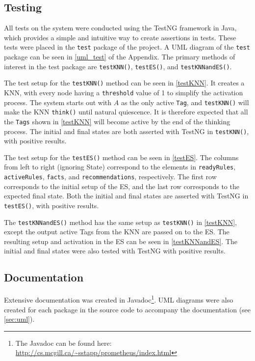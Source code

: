 \documentclass[titlepage,11pt]{article}
\newcommand{\code}[1]{\texttt{#1}}
\begin{document}
\subsection{Testing}

All tests on the system were conducted using the TestNG framework in Java, which provides a simple and intuitive way to create assertions in tests. These tests were placed in the \code{test} package of the project. A UML diagram of the \code{test} package can be seen in \autoref{uml_test} of the Appendix. The primary methods of interest in the test package are \code{testKNN()}, \code{testES()}, and \code{testKNNandES()}.

The test setup for the \code{testKNN()} method can be seen in \autoref{testKNN}. It creates a KNN, with every node having a \code{threshold} value of 1 to simplify the activation process. The system starts out with $A$ as the only active \code{Tag}, and \code{testKNN()} will make the KNN \code{think()} until natural quiescence. It is therefore expected that all the \code{Tags} shown in \autoref{testKNN} will become active by the end of the thinking process. The initial and final states are both asserted with TestNG in \code{testKNN()}, with positive results.

The test setup for the \code{testES()} method can be seen in \autoref{testES}. The columns from left to right (ignoring State) correspond to the elements in \code{readyRules}, \code{activeRules}, \code{facts}, and \code{recommendations}, respectively. The first row corresponds to the initial setup of the ES, and the last row corresponds to the expected final state. Both the initial and final states are asserted with TestNG in \code{testES()}, with positive results.

The \code{testKNNandES()} method has the same setup as \code{testKNN()} in \autoref{testKNN}, except the output active Tags from the KNN are passed on to the ES. The resulting setup and activation in the ES can be seen in \autoref{testKNNandES}. The initial and final states were also tested with TestNG with positive results.

\subsection{Documentation}

 Extensive documentation was created in Javadoc\footnote{The Javadoc can be found here: \url{http://cs.mcgill.ca/~sstapp/prometheus/index.html}}. UML diagrams were also created for each package in the source code to accompany the documentation (see \autoref{sec:uml}).
\end{document}
